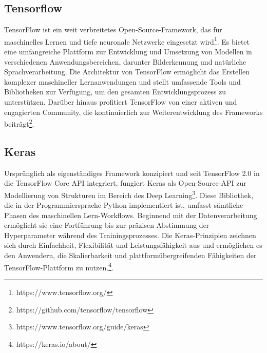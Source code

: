 \subsection{Tensorflow}
TensorFlow ist ein weit verbreitetes Open-Source-Framework, das für maschinelles Lernen und tiefe neuronale Netzwerke eingesetzt wird\footnote{https://www.tensorflow.org/}. Es bietet eine umfangreiche Plattform zur Entwicklung und Umsetzung von Modellen in verschiedenen Anwendungsbereichen, darunter Bilderkennung und natürliche Sprachverarbeitung. Die Architektur von TensorFlow ermöglicht das Erstellen komplexer maschineller Lernanwendungen und stellt umfassende Tools und Bibliotheken zur Verfügung, um den gesamten Entwicklungsprozess zu unterstützen. Darüber hinaus profitiert TensorFlow von einer aktiven und engagierten Community, die kontinuierlich zur Weiterentwicklung des Frameworks beiträgt\footnote{https://github.com/tensorflow/tensorflow}.

\subsection{Keras}
Ursprünglich als eigenständiges Framework konzipiert und seit TensorFlow 2.0 in die TensorFlow Core API integriert, fungiert Keras als Open-Source-API zur Modellierung von Strukturen im Bereich des Deep Learning\footnote{https://www.tensorflow.org/guide/keras}. Diese Bibliothek, die in der Programmiersprache Python implementiert ist, umfasst sämtliche Phasen des maschinellen Lern-Workflows. Beginnend mit der Datenverarbeitung ermöglicht sie eine Fortführung bis zur präzisen Abstimmung der Hyperparameter während des Trainingsprozesses. Die Keras-Prinzipien zeichnen sich durch Einfachheit, Flexibilität und Leistungsfähigkeit aus und ermöglichen es den Anwendern, die Skalierbarkeit und plattformübergreifenden Fähigkeiten der TensorFlow-Plattform zu nutzen.\footnote{https://keras.io/about/}.